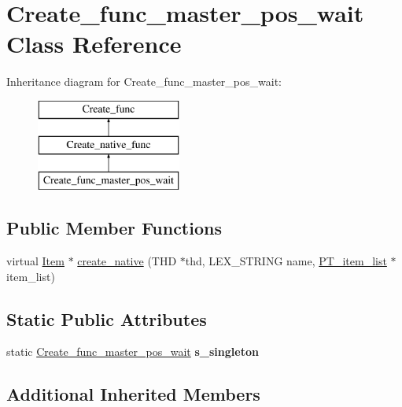 \hypertarget{classCreate__func__master__pos__wait}{}\section{Create\+\_\+func\+\_\+master\+\_\+pos\+\_\+wait Class Reference}
\label{classCreate__func__master__pos__wait}
Inheritance diagram for Create\+\_\+func\+\_\+master\+\_\+pos\+\_\+wait\+:\begin{figure}[H]
\begin{center}
\leavevmode
\includegraphics[height=3.000000cm]{classCreate__func__master__pos__wait}
\end{center}
\end{figure}
\subsection*{Public Member Functions}
\begin{DoxyCompactItemize}
\item 
virtual \mbox{\hyperlink{classItem}{Item}} $\ast$ \mbox{\hyperlink{classCreate__func__master__pos__wait_a34aaf7be08bc1d0a534cfda606609db4}{create\+\_\+native}} (T\+HD $\ast$thd, L\+E\+X\+\_\+\+S\+T\+R\+I\+NG name, \mbox{\hyperlink{classPT__item__list}{P\+T\+\_\+item\+\_\+list}} $\ast$item\+\_\+list)
\end{DoxyCompactItemize}
\subsection*{Static Public Attributes}
\begin{DoxyCompactItemize}
\item 
\mbox{\label{classCreate__func__master__pos__wait_ab39c8be0e3bae519527abe20cf5666ea}} 
static \mbox{\hyperlink{classCreate__func__master__pos__wait}{Create\+\_\+func\+\_\+master\+\_\+pos\+\_\+wait}} {\bfseries s\+\_\+singleton}
\end{DoxyCompactItemize}
\subsection*{Additional Inherited Members}


